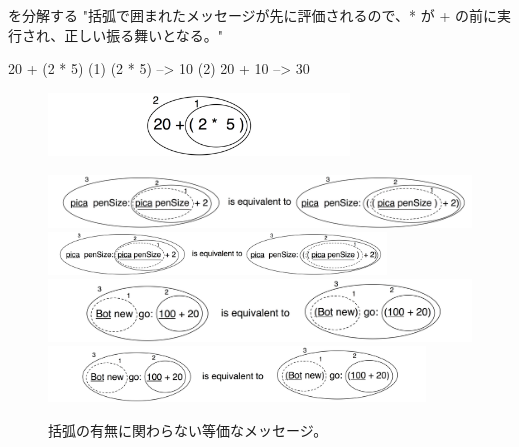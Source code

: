 \documentclass[a4paper,10pt,twoside]{book}
\begin{document}
\begin{example}[mathcorrect]{ を分解する}{}
"括弧で囲まれたメッセージが先に評価されるので、* が + の前に実行され、正しい振る舞いとなる。"

    20 + (2 * 5)
(1)        (2 * 5) --> 10
(2) 20 + 10      --> 30
\end{example}

\begin{figure}
\begin{center}
\includegraphics[width=8cm]{ucompoNumberBracket}
\end{center}
\end{figure}



\begin{figure}
\begin{center}
\ifluluelse
	{\includegraphics[width=\textwidth]{uKeyUnBinPar}}
	{\includegraphics[width=0.8\textwidth]{uKeyUnBinPar}}
\ifluluelse
	{\includegraphics[width=\textwidth]{uunKeyBinPar}}
	{\includegraphics[width=10cm]{uunKeyBinPar}}
\end{center}
\caption{括弧の有無に関わらない等価なメッセージ。}
\end{figure}
\end{document}
